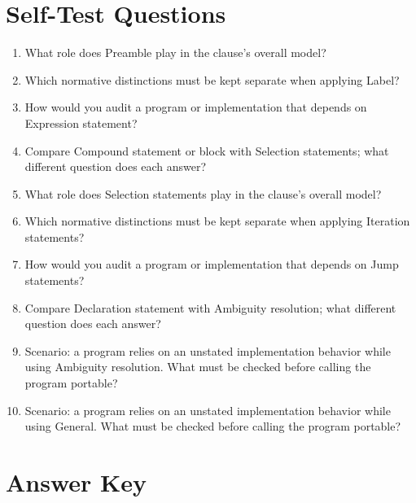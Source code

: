 \documentclass[11pt,letterpaper]{article}
\begin{document}
\section{Self-Test Questions}
\begin{enumerate}
\item What role does Preamble play in the clause's overall model?
\item Which normative distinctions must be kept separate when applying Label?
\item How would you audit a program or implementation that depends on Expression statement?
\item Compare Compound statement or block with Selection statements; what different question does each answer?
\item What role does Selection statements play in the clause's overall model?
\item Which normative distinctions must be kept separate when applying Iteration statements?
\item How would you audit a program or implementation that depends on Jump statements?
\item Compare Declaration statement with Ambiguity resolution; what different question does each answer?
\item Scenario: a program relies on an unstated implementation behavior while using Ambiguity resolution. What must be checked before calling the program portable?
\item Scenario: a program relies on an unstated implementation behavior while using General. What must be checked before calling the program portable?
\end{enumerate}
\clearpage\section{Answer Key}
\end{document}
